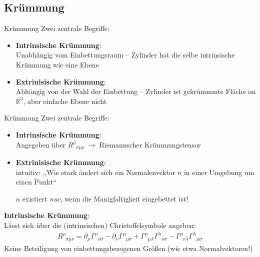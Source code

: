 \documentclass[mathserif]{beamer}
\theoremstyle{definition}
\begin{document}
\subsection{Krümmung}
	\begin{frame}{Krümmung}
		Zwei zentrale Begriffe:
		\begin{itemize}
			\item \textbf{Intrinsische Krümmung}:\\
				Unabhängig vom Einbettungsraum -- Zylinder hat die selbe intrinsische Krümmung wie eine Ebene
			\pause
			\item \textbf{Extrinisische Krümmung}:\\
				Abhängig von der Wahl der Einbettung -- Zylinder ist gekrümmmte Fläche im $\mathbb{R}^3$, aber einfache Ebene nicht
		\end{itemize}
	\end{frame}
	\begin{frame}{Krümmung}
		Zwei zentrale Begriffe:
		\begin{itemize}
			\item \textbf{Intrinsische Krümmung}:\\
				Angegeben über $R^\rho{}_{\sigma\mu\nu}\ \rightarrow$ Riemannscher Krümmungstensor
			\item \textbf{Extrinisische Krümmung}:\\
				intuitiv: ,,Wie stark ändert sich ein Normalenvektor $n$ in einer Umgebung um einen Punkt``
			\begin{center}
				$n$ existiert \textit{nur}, wenn die Manigfaltigkeit eingebettet ist!
			\end{center}
		\end{itemize}
	\end{frame}
	\begin{frame}
		\textbf{Intrinsische Krümmung}:\\
				Lässt sich über die (intrinsischen) Christoffelsymbole angeben:
				\begin{align}
					R^\rho{}_{\sigma\mu\nu} = \partial_\mu\Gamma^\rho{}_{\nu\sigma}
						- \partial_\nu\Gamma^\rho{}_{\mu\sigma}
						+ \Gamma^\rho{}_{\mu\lambda}\Gamma^\lambda{}_{\nu\sigma}
						- \Gamma^\rho{}_{\nu\lambda}\Gamma^\lambda{}_{\mu\sigma}
				\end{align}
				Keine Beteiligung von einbettungsbezogenen Größen (wie etwa Normalvektoren!)
	\end{frame}
\end{document}
